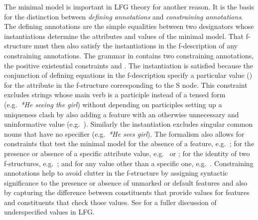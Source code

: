 \documentclass[output=paper,hidelinks]{langscibook}
\begin{document}
The minimal model is important in LFG theory for another reason.  It is the basis for the distinction between \emph{defining annotations} and \emph{constraining annotations}. The defining annotations are the simple equalities between two designators whose instantiations determine the attributes and values of the minimal model.  That f-structure must then also satisfy the instantiations in the f-description of any constraining annotations. The grammar in  contains two constraining annotations, the positive existential constraints  and .  The instantiation  is satisfied because the conjunction of defining equations in the f-description specify a particular value () for the attribute  in the f-structure corresponding to the S node.  This constraint excludes strings whose main verb is a participle instead of a tensed form (e.g.\ \emph{*He seeing the girl}) without depending on participles setting up a uniqueness clash by also adding a  feature with an otherwise unnecessary and uninformative value (e.g.\ ).  Similarly the instantiation  excludes singular common nouns that have no specifier (e.g.\ \emph{*He sees girl}). The formalism also allows for constraints that test the minimal model for the absence of a feature, e.g.\ ; for the presence or absence of a specific attribute value, e.g.\  or ; for the identity of two f-structures, e.g.\ ; and for any value other than a specific one, e.g.\ .  Constraining annotations help to avoid clutter in the f-structure by assigning syntactic significance to the presence or absence of unmarked or default features and also by capturing the difference between constituents that provide values for features  and constituents that check those values. See \citet{kaplan18} for a fuller discussion of underspecified values in LFG.
\end{document}
